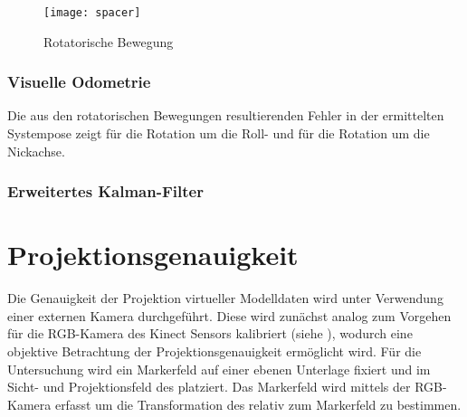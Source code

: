 \begin{figure}[!ht]
	\begin{center}
		\texttt{[image: spacer]}
		\caption{Rotatorische Bewegung}
		\label{fig.rotmove}
	\end{center}
\end{figure}


\subsubsection{Visuelle Odometrie}
Die aus den rotatorischen Bewegungen resultierenden Fehler in der ermittelten Systempose zeigt  für die Rotation um die Roll- und  für die Rotation um die Nickachse.




\subsubsection{Erweitertes Kalman-Filter}






\section{Projektionsgenauigkeit}
Die Genauigkeit der Projektion virtueller Modelldaten wird unter Verwendung einer externen Kamera durchgeführt. Diese wird zunächst analog zum Vorgehen für die RGB-Kamera des Kinect Sensors kalibriert (siehe ), wodurch eine objektive Betrachtung der Projektionsgenauigkeit ermöglicht wird. Für die Untersuchung wird ein Markerfeld auf einer ebenen Unterlage fixiert und im Sicht- und Projektionsfeld des  platziert. Das Markerfeld wird mittels der RGB-Kamera erfasst um die Transformation des  relativ zum Markerfeld zu bestimmen.\\

